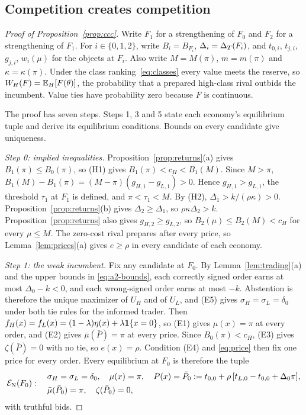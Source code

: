 \subsection{Competition creates competition}\label{app:prop2}

\begin{proof}[Proof of Proposition~\ref{prop:ccc}]
Write \(F_1\) for a strengthening of \(F_0\) and \(F_2\) for a
strengthening of \(F_1\). For \(i\in\{0,1,2\}\), write \(B_i=B_{F_i}\), \(\Delta_i=\Delta_T(F_i)\), and \(t_{0,i}\),
\(t_{j,i}\), \(g_{j,i}\), \(w_i(\mu)\) for the objects at \(F_i\). Also write \(M=M(\pi)\), \(m=m(\pi)\) and
\(\kappa=\kappa(\pi)\). Under the class ranking~\eqref{eq:classes} every value meets the reserve, so
\(W_H(F)=\mathbb{E}_H[F(\theta)]\), the probability that a prepared high-class rival outbids the incumbent. Value ties
have probability zero because \(F\) is continuous.

The proof has seven steps. Steps 1, 3 and 5 state each economy's equilibrium tuple and derive its equilibrium
conditions. Bounds on every candidate give uniqueness.

\emph{Step 0: implied inequalities.} Proposition~\ref{prop:returns}(a) gives \(B_1(\pi)\le B_0(\pi)\), so (H1)
gives \(B_1(\pi)<c_H<B_1(M)\). Since \(M>\pi\), \(B_1(M)-B_1(\pi)=(M-\pi)(g_{H,1}-g_{L,1})>0\). Hence
\(g_{H,1}>g_{L,1}\), the threshold \(\tau_1\) at \(F_1\) is defined, and \(\pi<\tau_1<M\). By (H2),
\(\Delta_1>k/(\rho\kappa)>0\). Proposition~\ref{prop:returns}(b) gives \(\Delta_2\ge\Delta_1\), so
\(\rho\kappa\Delta_2>k\). Proposition~\ref{prop:returns} also gives \(g_{H,2}\ge g_{L,2}\), so
\(B_2(\mu)\le B_2(M)<c_H\) for every \(\mu\le M\). The zero-cost rival prepares after every price, so
Lemma~\ref{lem:prices}(a) gives \(e\ge\rho\) in every candidate of each economy.

\emph{Step 1: the weak incumbent.} Fix any candidate at \(F_0\). By Lemma~\ref{lem:trading}(a) and the upper bounds
in \eqref{eq:a2-bounds}, each correctly signed order earns at most \(\Delta_0-k<0\), and each wrong-signed order
earns at most \(-k\). Abstention is therefore the unique maximizer of \(U_H\) and of \(U_L\), and (E5) gives
\(\sigma_H=\sigma_L=\delta_0\) under both tie rules for the informed trader. Then \(f_H(x)=f_L(x)=(1-\lambda)\eta(x)+\lambda\mathbf{1}\{x=0\}\),
so (E1) gives \(\mu(x)=\pi\) at every order, and (E2) gives \(\bar\mu(\bar P)=\pi\) at every price. Since
\(B_0(\pi)<c_H\), (E3) gives \(\zeta(\bar P)=0\) with no tie, so \(e(x)=\rho\). Condition (E4) and
\eqref{eq:price} then fix one price for every order. Every equilibrium at \(F_0\) is therefore the tuple
\[
\mathcal E_{\rm N}(F_0):\quad
\begin{aligned}
&\sigma_H=\sigma_L=\delta_0,\quad \mu(x)=\pi,\quad P(x)=\bar P_0:=t_{0,0}+\rho\,[t_{L,0}-t_{0,0}+\Delta_0\pi],\\
&\bar\mu(\bar P_0)=\pi,\quad \zeta(\bar P_0)=0,
\end{aligned}
\]
with truthful bids.


\end{proof}
